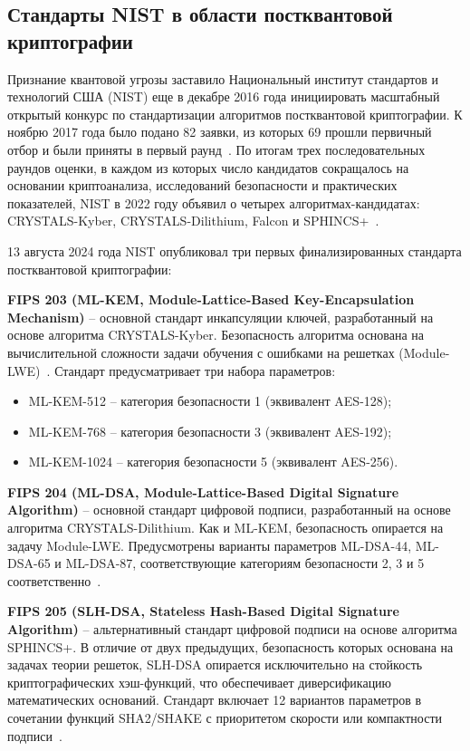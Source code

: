 \documentclass{itmo-vkr}
\begin{document}
	\subsection{Стандарты NIST в области постквантовой криптографии}
	
	Признание квантовой угрозы заставило Национальный институт стандартов и технологий США (NIST) еще в декабре 2016 года инициировать масштабный открытый конкурс по стандартизации алгоритмов постквантовой криптографии. К ноябрю 2017 года было подано 82 заявки, из которых 69 прошли первичный отбор и были приняты в первый раунд~\cite{nist-fips203}. По итогам трех последовательных раундов оценки, в каждом из которых число кандидатов сокращалось на основании криптоанализа, исследований безопасности и практических показателей, NIST в 2022 году объявил о четырех алгоритмах-кандидатах: CRYSTALS-Kyber, CRYSTALS-Dilithium, Falcon и SPHINCS+~\cite{komarova2019pqsig,razumov2019ntru}.
	
	13 августа 2024 года NIST опубликовал три первых финализированных стандарта постквантовой криптографии:
	
	\textbf{FIPS 203 (ML-KEM, Module-Lattice-Based Key-Encapsulation Mechanism)}\cite{nist-fips203} -- основной стандарт инкапсуляции ключей, разработанный на основе алгоритма CRYSTALS-Kyber. Безопасность алгоритма основана на вычислительной сложности задачи обучения с ошибками на решетках (Module-LWE)~\cite{bakharev2022oracle}. Стандарт предусматривает три набора параметров:
	
	\begin{itemize}
		\item ML-KEM-512 -- категория безопасности 1 (эквивалент AES-128);
		\item ML-KEM-768 -- категория безопасности 3 (эквивалент AES-192);
		\item ML-KEM-1024 -- категория безопасности 5 (эквивалент AES-256).
	\end{itemize}
	
	\textbf{FIPS 204 (ML-DSA, Module-Lattice-Based Digital Signature Algorithm)}\cite{nist-fips204} -- основной стандарт цифровой подписи, разработанный на основе алгоритма CRYSTALS-Dilithium. Как и ML-KEM, безопасность опирается на задачу Module-LWE. Предусмотрены варианты параметров ML-DSA-44, ML-DSA-65 и ML-DSA-87, соответствующие категориям безопасности 2, 3 и 5 соответственно~\cite{kirshanova2020pqsig}.
	
	\textbf{FIPS 205 (SLH-DSA, Stateless Hash-Based Digital Signature Algorithm)}\cite{nist-fips205} -- альтернативный стандарт цифровой подписи на основе алгоритма SPHINCS+. В отличие от двух предыдущих, безопасность которых основана на задачах теории решеток, SLH-DSA опирается исключительно на стойкость криптографических хэш-функций, что обеспечивает диверсификацию математических оснований. Стандарт включает 12 вариантов параметров в сочетании функций SHA2/SHAKE с приоритетом скорости или компактности подписи~\cite{panasenko2025slhdsa}.
	
\end{document}
